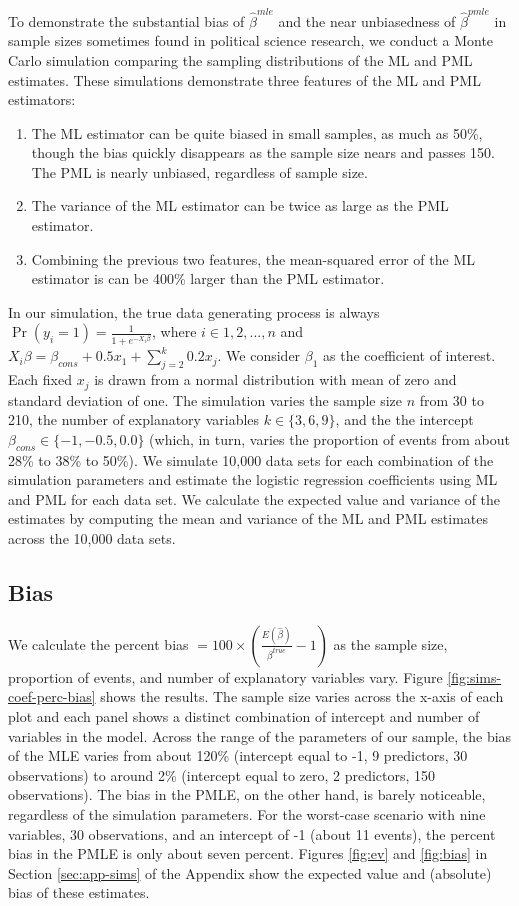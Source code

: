 \documentclass[12pt]{article}
\begin{document}
To demonstrate the substantial bias of $\hat{\beta}^{mle}$ and the near unbiasedness of $\hat{\beta}^{pmle}$ in sample sizes sometimes found in political science research, we conduct a Monte Carlo simulation comparing the sampling distributions of the ML and PML estimates.
These simulations demonstrate three features of the ML and PML estimators:
\begin{enumerate}
\item The ML estimator can be quite biased in small samples, as much as 50\%, though the bias quickly disappears as the sample size nears and passes 150. The PML is nearly unbiased, regardless of sample size.
\item The variance of the ML estimator can be twice as large as the PML estimator.
\item Combining the previous two features, the mean-squared error of the ML estimator is can be 400\% larger than the PML estimator.
\end{enumerate}
In our simulation, the true data generating process is always $\Pr(y_i = 1) = \frac{1}{1 + e^{-X_i \beta}}$, where $i \in 1, 2,..., n$ and $X_i \beta = \beta_{cons} + 0.5 x_1 + \sum_{j = 2}^k 0.2 x_j$. 
We consider $\beta_1$ as the coefficient of interest.
Each fixed $x_j$ is drawn from a normal distribution with mean of zero and standard deviation of one. 
The simulation varies the sample size $n$ from 30 to 210, the number of explanatory variables $k \in \{3, 6, 9\}$, and the the intercept $\beta_{cons} \in \{-1, -0.5, 0.0\}$ (which, in turn, varies the proportion of events from about 28\% to 38\% to 50\%). 
We simulate 10,000 data sets for each combination of the simulation parameters and estimate the logistic regression coefficients using ML and PML for each data set.
We calculate the expected value and variance of the estimates by computing the mean and variance of the ML and PML estimates across the 10,000 data sets. 

\subsection*{Bias}

We calculate the percent bias $= 100 \times \left(\frac{E(\hat{\beta})}{\beta^{true}} - 1 \right)$ as the sample size, proportion of events, and number of explanatory variables vary.  
Figure \ref{fig:sims-coef-perc-bias} shows the results. 
The sample size varies across the x-axis of each plot and each panel shows a distinct combination of intercept and number of variables in the model. 
Across the range of the parameters of our sample, the bias of the MLE varies from about 120\% (intercept equal to -1, 9 predictors, 30 observations) to around 2\% (intercept equal to zero, 2 predictors, 150 observations). 
The bias in the PMLE, on the other hand, is barely noticeable, regardless of the simulation parameters. 
For the worst-case scenario with nine variables, 30 observations, and an intercept of -1 (about 11 events), the percent bias in the PMLE is only about seven percent. 
Figures \ref{fig:ev} and \ref{fig:bias} in Section \ref{sec:app-sims} of the Appendix show the expected value and (absolute) bias of these estimates.
\end{document}
